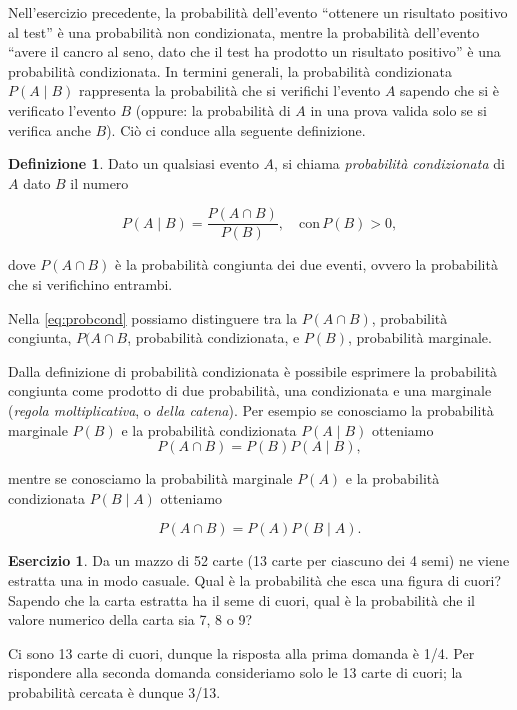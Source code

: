 \documentclass[
  11pt,
]{krantz}
\theoremstyle{definition}
\newtheorem{definition}{Definizione}[chapter]
\theoremstyle{definition}
\theoremstyle{definition}
\newtheorem{exercise}{Esercizio}[chapter]
\theoremstyle{definition}
\theoremstyle{remark}
\begin{document}
Nell'esercizio precedente, la probabilità dell'evento ``ottenere un risultato positivo al test'' è una probabilità non condizionata, mentre la probabilità dell'evento ``avere il cancro al seno, dato che il test ha prodotto un risultato positivo'' è una probabilità condizionata. In termini generali, la probabilità condizionata \(P(A \mid B)\) rappresenta la probabilità che si verifichi l'evento \(A\) sapendo che si è verificato l'evento \(B\) (oppure: la probabilità di \(A\) in una prova valida solo se si verifica anche \(B\)). Ciò ci conduce alla seguente definizione.

\begin{definition}
Dato un qualsiasi evento \(A\), si chiama \emph{probabilità condizionata} di \(A\) dato \(B\) il numero

\begin{equation}
P(A \mid B) = \frac{P(A \cap B)}{P(B)}, \quad \text{con}\, P(B) > 0,
\label{eq:probcond}
\end{equation}

dove \(P(A\cap B)\) è la probabilità congiunta dei due eventi, ovvero la probabilità che si verifichino entrambi.
\end{definition}

Nella \eqref{eq:probcond} possiamo distinguere tra la \(P(A\cap B)\), probabilità congiunta, \(P(A \cap B\), probabilità condizionata, e \(P(B)\), probabilità marginale.

Dalla definizione di probabilità condizionata è possibile esprimere la probabilità congiunta come prodotto di due probabilità, una condizionata e una marginale (\emph{regola moltiplicativa}, o \emph{della catena}). Per esempio se conosciamo la probabilità marginale \(P(B)\) e la probabilità condizionata \(P(A \mid B)\) otteniamo \begin{equation}
P(A \cap B) = P(B)P(A \mid B),
\label{eq:probcondinv}
\end{equation}

mentre se conosciamo la probabilità marginale \(P(A)\) e la probabilità condizionata \(P(B \mid A)\) otteniamo

\[
P(A \cap B) = P(A)P(B \mid A).
\]

\begin{exercise}
Da un mazzo di 52 carte (13 carte per ciascuno dei 4 semi) ne viene estratta una in modo casuale. Qual è la probabilità che esca una figura di cuori? Sapendo che la carta estratta ha il seme di cuori, qual è la probabilità che il valore numerico della carta sia 7, 8 o 9?

Ci sono 13 carte di cuori, dunque la risposta alla prima domanda è 1/4. Per rispondere alla seconda domanda consideriamo solo le 13 carte di cuori; la probabilità cercata è dunque 3/13.
\end{exercise}
\end{document}
